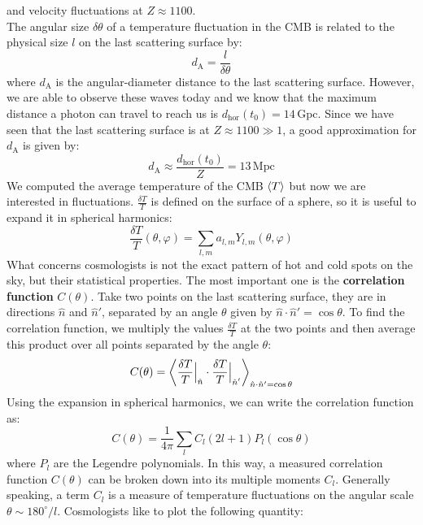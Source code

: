 \documentclass[10.75pt,a4paper,openright,bottom=2cm]{article}
\begin{document}
and velocity fluctuations at $Z\approx1100$.\\
The angular size $\delta\theta$ of a temperature fluctuation in the CMB is related to the physical size $l$ on the last scattering surface by:
\[
d_{\text{A}}=\frac{l}{\delta\theta}
\]
where $d_{\text{A}}$ is the angular-diameter distance to the last scattering surface. However, we are able to observe these waves today and we know that the maximum distance a photon can travel to reach us is $d_{\text{hor}}(t_0)=14$\,Gpc. Since we have seen that the last scattering surface is at $Z\approx1100\gg1$, a good approximation for $d_{\text{A}}$ is given by:
\[
d_{\text{A}}\approx\frac{d_{\text{hor}}(t_0)}{Z}=13\,\text{Mpc}
\]
We computed the average temperature of the CMB $\Braket{T}$ but now we are interested in fluctuations. $\frac{\delta T}{T}$ is defined on the surface of a sphere, so it is useful to expand it in spherical harmonics:
\[
\frac{\delta T}{T}(\theta,\varphi)=\sum_{l,m}a_{l,m}Y_{l,m}(\theta,\varphi)
\]
What concerns cosmologists is not the exact pattern of hot and cold spots on the sky, but their statistical properties. The most important one is the \textbf{correlation function} $C(\theta)$. Take two points on the last scattering surface, they are in directions $\hat{n}$ and $\hat{n}'$, separated by an angle $\theta$ given by $\hat{n}\cdot\hat{n}'=\cos\theta$. To find the correlation function, we multiply the values $\frac{\delta T}{T}$ at the two points and then average this product over all points separated by the angle $\theta$:
\[
C(\theta)=\Braket{\frac{\delta T}{T}\Bigr|_{\substack{\hat{n}}}\cdot\frac{\delta T}{T}\Bigr|_{\substack{\hat{n}'}}}_{\hat{n}\cdot\hat{n}'=\cos\theta}
\]
Using the expansion in spherical harmonics, we can write the correlation function as:
\[
C(\theta)=\frac{1}{4\pi}\sum_lC_l(2l+1)P_l(\cos\theta)
\]
where $P_l$ are the Legendre polynomials. In this way, a measured correlation function $C(\theta)$ can be broken down into its multiple moments $C_l$. Generally speaking, a term $C_l$ is
a measure of temperature fluctuations on the angular scale $\theta\sim180^\circ/l$. Cosmologists like to plot the following quantity:
\end{document}
